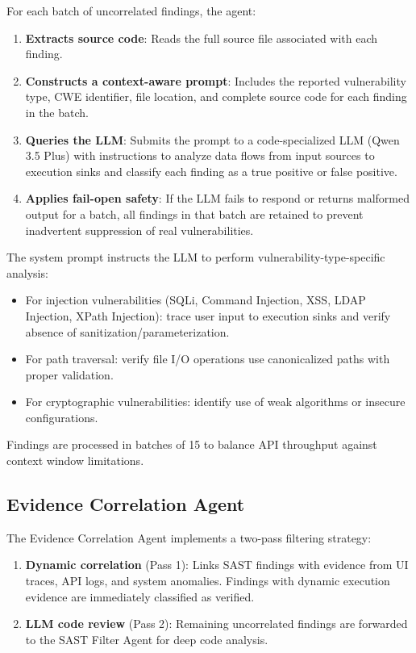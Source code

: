 \documentclass[conference]{IEEEtran}
\begin{document}
For each batch of uncorrelated findings, the agent:
\begin{enumerate}
    \item \textbf{Extracts source code}: Reads the full source file associated with each finding.
    \item \textbf{Constructs a context-aware prompt}: Includes the reported vulnerability type, CWE identifier, file location, and complete source code for each finding in the batch.
    \item \textbf{Queries the LLM}: Submits the prompt to a code-specialized LLM (Qwen 3.5 Plus) with instructions to analyze data flows from input sources to execution sinks and classify each finding as a true positive or false positive.
    \item \textbf{Applies fail-open safety}: If the LLM fails to respond or returns malformed output for a batch, all findings in that batch are retained to prevent inadvertent suppression of real vulnerabilities.
\end{enumerate}

The system prompt instructs the LLM to perform vulnerability-type-specific analysis:
\begin{itemize}
    \item For injection vulnerabilities (SQLi, Command Injection, XSS, LDAP Injection, XPath Injection): trace user input to execution sinks and verify absence of sanitization/parameterization.
    \item For path traversal: verify file I/O operations use canonicalized paths with proper validation.
    \item For cryptographic vulnerabilities: identify use of weak algorithms or insecure configurations.
\end{itemize}

Findings are processed in batches of 15 to balance API throughput against context window limitations.

\subsection{Evidence Correlation Agent}
The Evidence Correlation Agent implements a two-pass filtering strategy:
\begin{enumerate}
    \item \textbf{Dynamic correlation} (Pass 1): Links SAST findings with evidence from UI traces, API logs, and system anomalies. Findings with dynamic execution evidence are immediately classified as verified.
    \item \textbf{LLM code review} (Pass 2): Remaining uncorrelated findings are forwarded to the SAST Filter Agent for deep code analysis.
\end{enumerate}
\end{document}
